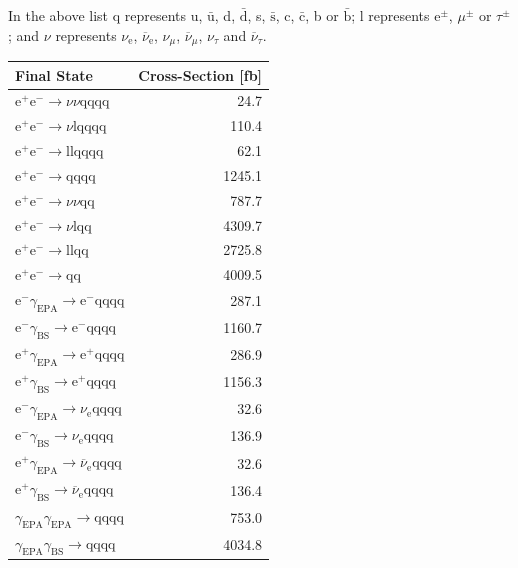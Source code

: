 %
\noindent In the above list q represents u, $\bar{\text{u}}$, d, $\bar{\text{d}}$, s, $\bar{\text{s}}$, c, $\bar{\text{c}}$, b or $\bar{\text{b}}$;  l represents $\text{e}^{\pm}$, $\mu^{\pm}$ or $\tau^{\pm}$; and $\nu$ represents $\nu_{\text{e}}$, $\overline{\nu}_{\text{e}}$, $\nu_{\mu}$, $\overline{\nu}_{\mu}$, $\nu_{\tau}$ and $\overline{\nu}_{\tau}$.
%
\begin{table}[h!]
\centering
\begin{tabular}{ l r }
\hline
Final State & Cross-Section [fb] \\ 
\hline
$\text{e}^{+}\text{e}^{-} \rightarrow \nu{\nu}\text{qqqq}$ & 24.7 \\
$\text{e}^{+}\text{e}^{-} \rightarrow \nu\text{lqqqq}$ & 110.4\\
$\text{e}^{+}\text{e}^{-} \rightarrow \text{llqqqq}$ & 62.1\\
$\text{e}^{+}\text{e}^{-} \rightarrow \text{qqqq}$ & 1245.1\\
$\text{e}^{+}\text{e}^{-} \rightarrow \nu{\nu}\text{qq}$ & 787.7\\
$\text{e}^{+}\text{e}^{-} \rightarrow \nu\text{lqq}$ & 4309.7\\
$\text{e}^{+}\text{e}^{-} \rightarrow \text{llqq}$ & 2725.8\\
$\text{e}^{+}\text{e}^{-} \rightarrow \text{qq}$ & 4009.5\\
$\text{e}^{-}\gamma_{\text{EPA}} \rightarrow \text{e}^{-}\text{qqqq}$ & 287.1\\
$\text{e}^{-}\gamma_{\text{BS}} \rightarrow \text{e}^{-}\text{qqqq}$ & 1160.7\\
$\text{e}^{+}\gamma_{\text{EPA}} \rightarrow \text{e}^{+}\text{qqqq}$ & 286.9\\
$\text{e}^{+}\gamma_{\text{BS}} \rightarrow \text{e}^{+}\text{qqqq}$ & 1156.3\\
$\text{e}^{-}\gamma_{\text{EPA}} \rightarrow \nu_{\text{e}}\text{qqqq}$ & 32.6\\
$\text{e}^{-}\gamma_{\text{BS}} \rightarrow \nu_{\text{e}}\text{qqqq}$ & 136.9\\
$\text{e}^{+}\gamma_{\text{EPA}} \rightarrow \overline{\nu}_{\text{e}}\text{qqqq}$ & 32.6\\
$\text{e}^{+}\gamma_{\text{BS}} \rightarrow \overline{\nu}_{\text{e}}\text{qqqq}$ & 136.4\\
$\gamma_{\text{EPA}}\gamma_{\text{EPA}} \rightarrow \text{qqqq}$ & 753.0\\
$\gamma_{\text{EPA}}\gamma_{\text{BS}} \rightarrow \text{qqqq}$ & 4034.8\\

\end{tabular}
\end{table}

